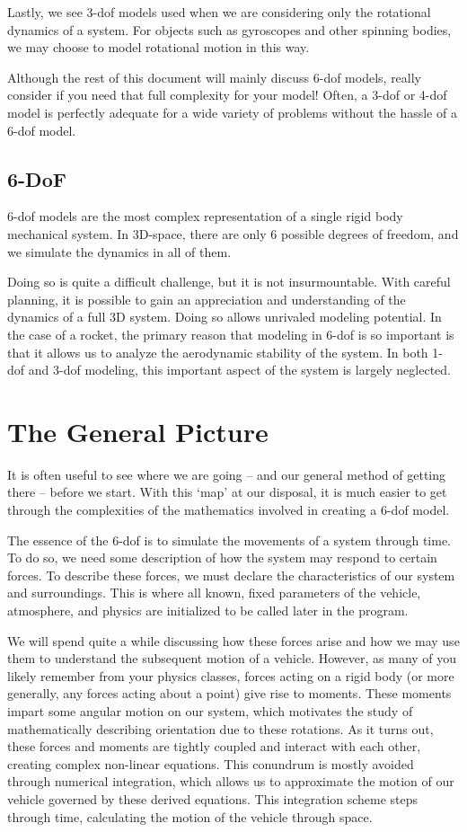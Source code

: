 \documentclass[10pt, openany, titlepage]{book}
\theoremstyle{definition}
\begin{document}
Lastly, we see 3-\gls{dof} models used when we are considering only the rotational dynamics of a system. For objects such as gyroscopes and other spinning bodies, we may choose to model rotational motion in this way.

Although the rest of this document will mainly discuss 6-\gls{dof} models, really consider if you need that full complexity for your model! Often, a 3-\gls{dof} or 4-\gls{dof} model is perfectly adequate for a wide variety of problems without the hassle of a 6-\gls{dof} model. 
\subsection{6-DoF}
6-\gls{dof} models are the most complex representation of a single rigid body mechanical system. In 3D-space, there are only 6 possible degrees of freedom, and we simulate the dynamics in all of them.

Doing so is quite a difficult challenge, but it is not insurmountable. With careful planning, it is possible to gain an appreciation and understanding of the dynamics of a full 3D system. Doing so allows unrivaled modeling potential. In the case of a rocket, the primary reason that modeling in 6-\gls{dof} is so important is that it allows us to analyze the aerodynamic stability of the system. In both 1-\gls{dof} and 3-\gls{dof} modeling, this important aspect of the system is largely neglected.

\section{The General Picture}

It is often useful to see where we are going -- and our general method of getting there -- before we start. With this `map' at our disposal, it is much easier to get through the complexities of the mathematics involved in creating a 6-\gls{dof} model.

The essence of the 6-\gls{dof} is to simulate the movements of a system through time. To do so, we need some description of how the system may respond to certain forces. To describe these forces, we must declare the characteristics of our system and surroundings. This is where all known, fixed parameters of the vehicle, atmosphere, and physics are initialized to be called later in the program.

We will spend quite a while discussing how these forces arise and how we may use them to understand the subsequent motion of a vehicle. However, as many of you likely remember from your physics classes, forces acting on a rigid body (or more generally, any forces acting about a point) give rise to moments. These moments impart some angular motion on our system, which motivates the study of mathematically describing orientation due to these rotations. As it turns out, these forces and moments are tightly coupled and interact with each other, creating complex non-linear equations. This conundrum is mostly avoided through numerical integration, which allows us to approximate the motion of our vehicle governed by these derived equations. This integration scheme steps through time, calculating the motion of the vehicle through space.
\end{document}
